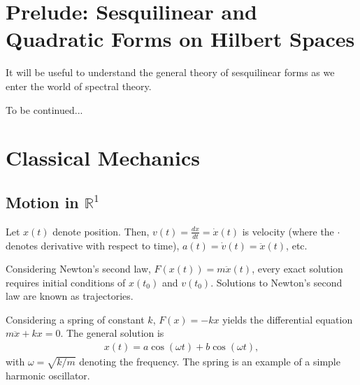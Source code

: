 \documentclass[10pt]{extarticle}
\newcommand{\R}{\mathbb{R}}
\theoremstyle{plain}
\theoremstyle{definition}
\theoremstyle{remark}
\renewcommand{\newline}{\hfill\break}
\begin{document}
  \section{Prelude: Sesquilinear and Quadratic Forms on Hilbert Spaces}%
  It will be useful to understand the general theory of sesquilinear forms as we enter the world of spectral theory.\newline

  To be continued...
  \section{Classical Mechanics}%
  \subsection{Motion in $\R^{1}$}%
  Let $x(t)$ denote position. Then, $v(t) = \frac{dx}{dt} = \dot{x}(t)$ is velocity (where the $\cdot$ denotes derivative with respect to time), $a(t) = \dot{v}(t) = \ddot{x}(t)$, etc.\newline

  Considering Newton's second law, $F(x(t)) = m\ddot{x}(t)$, every exact solution requires initial conditions of $x(t_0)$ and $v(t_0)$. Solutions to Newton's second law are known as trajectories.\newline

  Considering a spring of constant $k$, $F(x) = -kx$ yields the differential equation $m\ddot{x} + kx = 0$. The general solution is
  \begin{align*}
    x(t) = a\cos(\omega t) + b\cos(\omega t),
  \end{align*}
  with $\omega = \sqrt{k/m}$ denoting the frequency. The spring is an example of a simple harmonic oscillator.
\end{document}
